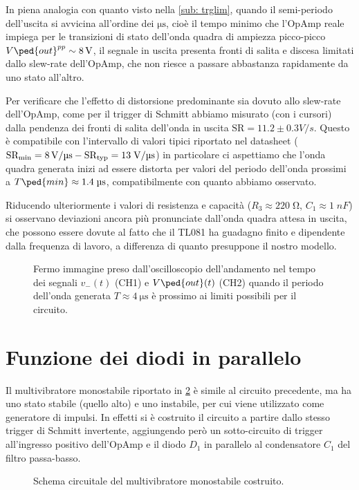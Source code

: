 \documentclass[10pt, a4paper, italian]{article}
\begin{document}
In piena analogia con quanto visto nella \cref{sub: trglim}, quando il
semi-periodo dell'uscita si avvicina all'ordine dei $\si{\micro\s}$, cioè il
tempo minimo che l'OpAmp reale impiega per le transizioni di stato dell'onda
quadra di ampiezza picco-picco $V\ped{out}^{pp} \sim \SI{8}{\V}$, il segnale
in uscita presenta fronti di salita e discesa limitati dallo slew-rate
dell'OpAmp, che non riesce a passare abbastanza rapidamente da uno stato
all'altro.

Per verificare che l'effetto di distorsione predominante sia dovuto allo
slew-rate dell'OpAmp, come per il trigger di Schmitt abbiamo misurato (con
i cursori) dalla pendenza dei fronti di salita dell'onda in uscita
$\mathrm{SR} = 11.2 \pm 0.3 \si{V/s}$. Questo è compatibile con l'intervallo
di valori tipici riportato nel datasheet
($\rm SR_{min} = \SI{8}{\V/\micro\s} - SR_{typ} = 13 \; \si{\V/\micro\s}$)
in particolare ci aspettiamo che l'onda quadra generata inizi ad essere
distorta per valori del periodo dell'onda prossimi a
$T\ped{min} \approx 1.4 \; \si{\micro\s}$, compatibilmente con quanto abbiamo
osservato.

Riducendo ulteriormente i valori di resistenza e capacità
($R_3 \approx 220 \; \si{\ohm}$, $C_1 \approx 1 \; \si{nF}$) si osservano
deviazioni ancora più pronunciate dall'onda quadra attesa in uscita, che
possono essere dovute al fatto che il TL081 ha guadagno finito e dipendente
dalla frequenza di lavoro, a differenza di quanto presuppone il nostro modello. 
\begin{figure}[htbp]
	\centering
	\caption{Fermo immagine preso dall'oscilloscopio dell'andamento nel tempo dei
	segnali $v_- (t)$ (CH1) e $V\ped{out} (t)$ (CH2) quando il periodo dell'onda
	generata $T \approx \SI{4}{\micro\s}$ è prossimo ai limiti possibili per il
	circuito. \label{fig: astable_lim}}
\end{figure}

\section{Funzione dei diodi in parallelo}
Il multivibratore monostabile riportato in \cref{fig: mstableschm} è simile
al circuito precedente, ma ha uno stato stabile (quello alto) e uno instabile,
per cui viene utilizzato come generatore di impulsi. In effetti si è costruito
il circuito a partire dallo stesso trigger di Schmitt invertente, aggiungendo
però un sotto-circuito di trigger all'ingresso positivo dell'OpAmp e il diodo
$D_1$ in parallelo al condensatore $C_1$ del filtro passa-basso.
\begin{figure}[htbp]
    \centering
    \caption{Schema circuitale del multivibratore monostabile costruito.
    \label{fig: mstableschm}}
\end{figure}
\end{document}

